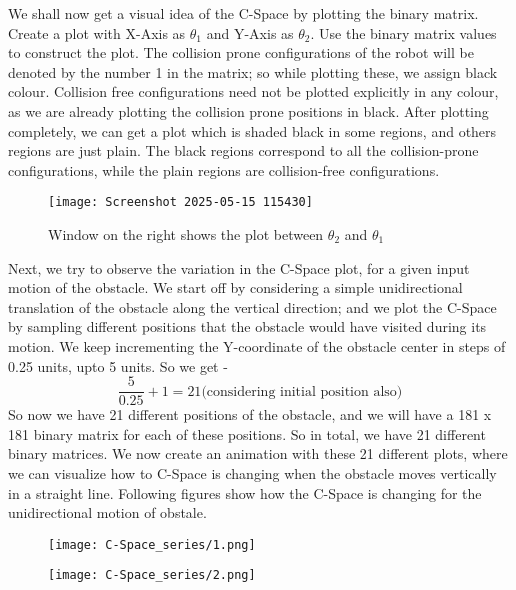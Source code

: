 \documentclass[12pt]{article}
\begin{document}
We shall now get a visual idea of the C-Space by plotting the binary matrix. Create a plot with X-Axis as $\theta_1$ and Y-Axis as $\theta_2$. Use the binary matrix values to construct the plot. The collision prone configurations of the robot will be denoted by the number 1 in the matrix; so while plotting these, we assign black colour. Collision free configurations need not be plotted explicitly in any colour, as we are already plotting the collision prone positions in black. After plotting completely, we can get a plot which is shaded black in some regions, and others regions are just plain. The black regions correspond to all the collision-prone configurations, while the plain regions are collision-free configurations.
\begin{figure}[h]
    \centering
    \texttt{[image: Screenshot 2025-05-15 115430]}
    \caption{Window on the right shows the plot between $\theta_2$ and $\theta_1$}
    \label{fig:1}
\end{figure}

Next, we try to observe the variation in the C-Space plot, for a given input motion of the obstacle. We start off by considering a simple unidirectional translation of the obstacle along the vertical direction; and we plot the C-Space by sampling different positions that the obstacle would have visited during its motion. We keep incrementing the Y-coordinate of the obstacle center in steps of 0.25 units, upto 5 units. So we get - 
\[
\frac{5}{0.25} + 1 = 21 \text{(considering initial position also)}
\]
So now we have 21 different positions of the obstacle, and we will have a 181 x 181 binary matrix for each of these positions. So in total, we have 21 different binary matrices. We now create an animation with these 21 different plots, where we can visualize how to C-Space is changing when the obstacle moves vertically in a straight line. Following figures show how the C-Space is changing for the unidirectional motion of obstale.
\begin{figure}[h]
    \centering

    \begin{minipage}{0.48\textwidth}
        \centering
        \texttt{[image: C-Space\_series/1.png]}
    \end{minipage}
    \hfill
    \begin{minipage}{0.48\textwidth}
        \centering
        \texttt{[image: C-Space\_series/2.png]}
    \end{minipage}

\end{figure}
\clearpage  %
\end{document}
